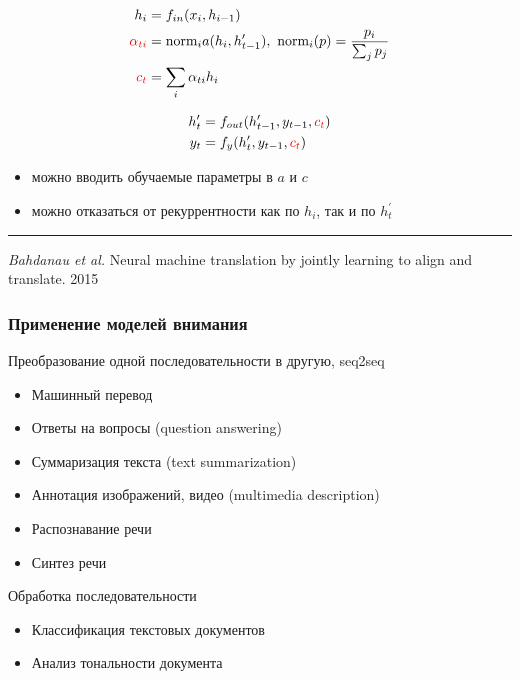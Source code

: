 \documentclass[fullscreen=true, bookmarks=true, hyperref={pdfencoding=unicode}]{beamer}
\begin{document}
\begin{frame}

  \begin{align*}
    h_i &= f_{in}(x_i, h_{i-1}) \\
    {\color{red}\alpha_{ti}} &= \text{norm}_i a(h_i, h^\prime_{t-1}),\text{ norm}_i(p) = \frac{p_i}{\sum_j p_j} \\
    {\color{red}c_t} &= \sum_i \alpha_{ti} h_i
  \end{align*}

  \begin{align*}
   h_t^\prime &= f_{out} (h^\prime_{t-1}, y_{t-1}, {\color{red}c_t}) \\
   y_t &= f_{y}(h_t^\prime, y_{t-1}, {\color{red}c_t})
  \end{align*}

  \begin{itemize}
    \item можно вводить обучаемые параметры в $a$ и $c$
    \item можно отказаться от рекуррентности как по $h_i$, так и по $h_t^\prime$
  \end{itemize}

   \noindent\rule{8cm}{0.4pt}

  {\it Bahdanau et al.} Neural machine translation by jointly learning to align and translate. 2015
\end{frame}

\begin{frame}
  \frametitle{Применение моделей внимания}

  Преобразование одной последовательности в другую, seq2seq
  \begin{itemize}
    \item Машинный перевод
    \item Ответы на вопросы (question answering)
    \item Суммаризация текста (text summarization)
    \item Аннотация изображений, видео (multimedia description)
    \item Распознавание речи
    \item Синтез речи
  \end{itemize}

  \vspace{1cm}
  Обработка последовательности
  \begin{itemize}
    \item Классификация текстовых документов
    \item Анализ тональности документа
  \end{itemize}
 \end{frame}
\end{document}
